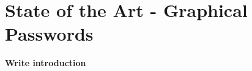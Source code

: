 
\chapter{State of the Art - Graphical Passwords}

	{\bf \color{red} Write introduction}





  

  

